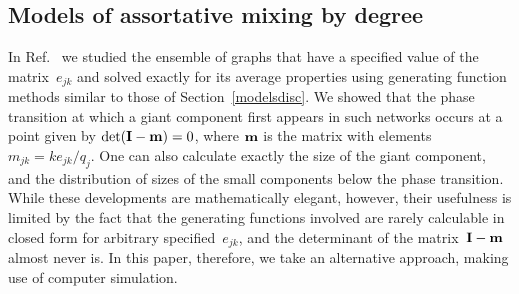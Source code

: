 \documentclass[twocolumn,pre]{revtex4}
\begin{document}
\subsection{Models of assortative mixing by degree}
\label{secmc}
In Ref.~ we studied the ensemble of graphs that have
a specified value of the matrix~$e_{jk}$ and solved exactly for its average
properties using generating function methods similar to those of
Section~\ref{modelsdisc}.  We showed that the phase transition at which a
giant component first appears in such networks occurs at a point given by
$\det(\mathbf{I}-\mathbf{m})=0$, where $\mathbf{m}$ is the matrix with elements $m_{jk} =
ke_{jk}/q_j$.  One can also calculate exactly the size of the giant
component, and the distribution of sizes of the small components below the
phase transition.  While these developments are mathematically elegant,
however, their usefulness is limited by the fact that the generating
functions involved are rarely calculable in closed form for arbitrary
specified~$e_{jk}$, and the determinant of the matrix~$\mathbf{I}-\mathbf{m}$ almost
never is.  In this paper, therefore, we take an alternative approach,
making use of computer simulation.
\end{document}
